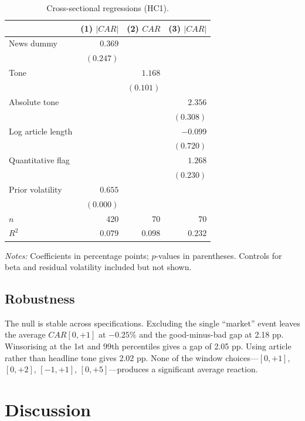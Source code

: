 \documentclass[10pt,twocolumn,a4paper]{article}
\begin{document}
\begin{table}[t]
\centering
\small
\begin{threeparttable}
\caption{Cross-sectional regressions (HC1).}
\label{tab:reg}
\begin{tabular}{@{}lrrr@{}}
\toprule
 & (1) $|CAR|$ & (2) $CAR$ & (3) $|CAR|$ \\
\midrule
News dummy & $0.369$ & & \\
 & $(0.247)$ & & \\
Tone & & $1.168$ & \\
 & & $(0.101)$ & \\
Absolute tone & & & $2.356$ \\
 & & & $(0.308)$ \\
Log article length & & & $-0.099$ \\
 & & & $(0.720)$ \\
Quantitative flag & & & $1.268$ \\
 & & & $(0.230)$ \\
Prior volatility & $0.655$ & & \\
 & $(0.000)$ & & \\
\midrule
$n$ & 420 & 70 & 70 \\
$R^2$ & $0.079$ & $0.098$ & $0.232$ \\
\bottomrule
\end{tabular}
\begin{tablenotes}[flushleft]\footnotesize
\item \textit{Notes:} Coefficients in percentage points; $p$-values in parentheses. Controls for beta and
residual volatility included but not shown.
\end{tablenotes}
\end{threeparttable}
\end{table}

\subsection{Robustness}

The null is stable across specifications. Excluding the single ``market'' event leaves the average
$CAR[0,+1]$ at $-0.25\%$ and the good-minus-bad gap at 2.18 pp. Winsorising at the 1st and 99th
percentiles gives a gap of 2.05 pp. Using article rather than headline tone gives 2.02 pp. None of the
window choices---$[0,+1]$, $[0,+2]$, $[-1,+1]$, $[0,+5]$---produces a significant average reaction.

\section{Discussion}
\end{document}
